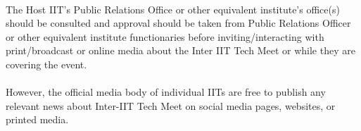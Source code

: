 
\paragraph{}
The Host IIT’s Public Relations Office or other equivalent institute’s office(s) should be consulted and approval should be taken from Public Relations Officer or other equivalent institute functionaries before inviting/interacting with print/broadcast or online media about the Inter IIT Tech Meet or while they are covering the event. 

\paragraph{}
However, the official media body of individual IITs are free to publish any relevant news about Inter-IIT Tech Meet on social media pages, websites, or printed media.
